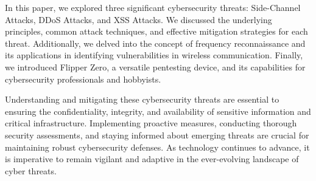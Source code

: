 \documentclass{article}
\begin{document}
In this paper, we explored three significant cybersecurity threats: Side-Channel Attacks, DDoS Attacks, and XSS Attacks. We discussed the underlying principles, common attack techniques, and effective mitigation strategies for each threat. Additionally, we delved into the concept of frequency reconnaissance and its applications in identifying vulnerabilities in wireless communication. Finally, we introduced Flipper Zero, a versatile pentesting device, and its capabilities for cybersecurity professionals and hobbyists.

Understanding and mitigating these cybersecurity threats are essential to ensuring the confidentiality, integrity, and availability of sensitive information and critical infrastructure. Implementing proactive measures, conducting thorough security assessments, and staying informed about emerging threats are crucial for maintaining robust cybersecurity defenses. As technology continues to advance, it is imperative to remain vigilant and adaptive in the ever-evolving landscape of cyber threats.
\end{document}
